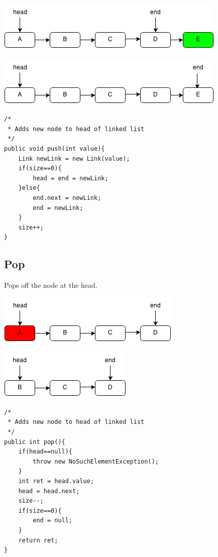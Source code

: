 \documentclass[11pt,oneside]{book}
\makeatletter
\def\maxwidth#1{\ifdim\Gin@nat@width>#1 #1\else\Gin@nat@width\fi}
\makeatother
\begin{document}
\vspace{5px}\includegraphics[width=\maxwidth{\textwidth}]{linkedlistpush2.png}

\vspace{5px}\includegraphics[width=\maxwidth{\textwidth}]{linkedlistpush3.png}

\begin{lstlisting}
/*
 * Adds new node to head of linked list
 */
public void push(int value){
    Link newLink = new Link(value);
    if(size==0){
        head = end = newLink;
    }else{
        end.next = newLink;
        end = newLink;
    }
    size++;
}
\end{lstlisting}

\subsection{Pop}

Pops off the node at the head.

\vspace{5px}\includegraphics[width=\maxwidth{\textwidth}]{linkedlistpop.png}

\vspace{5px}\includegraphics[width=\maxwidth{\textwidth}]{linkedlistpop2.png}

\begin{lstlisting}
/*
 * Adds new node to head of linked list
 */
public int pop(){
    if(head==null){
        throw new NoSuchElementException();
    }
    int ret = head.value;
    head = head.next;
    size--;
    if(size==0){
        end = null;
    }
    return ret;
}
\end{lstlisting}
\end{document}
